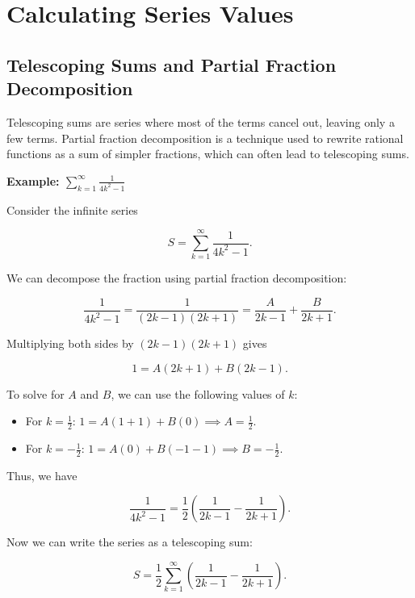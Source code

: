 \newpage
\section{Calculating Series Values}

\subsection{Telescoping Sums and Partial Fraction Decomposition}

Telescoping sums are series where most of the terms cancel out, leaving only a few terms. Partial fraction decomposition is a technique used to rewrite rational functions as a sum of simpler fractions, which can often lead to telescoping sums.
\vspace{\baselineskip}

\textbf{Example: \(\sum_{k=1}^{\infty} \frac{1}{4k^2 - 1}\)}
\vspace{\baselineskip}

Consider the infinite series

\[
    S = \sum_{k=1}^{\infty} \frac{1}{4k^2 - 1}.
\]

We can decompose the fraction using partial fraction decomposition:

\[
    \frac{1}{4k^2 - 1} = \frac{1}{(2k - 1)(2k + 1)} = \frac{A}{2k - 1} + \frac{B}{2k + 1}.
\]

Multiplying both sides by \((2k - 1)(2k + 1)\) gives

\[
    1 = A(2k + 1) + B(2k - 1).
\]

To solve for \(A\) and \(B\), we can use the following values of \(k\):

\begin{itemize}

    \item For \(k = \frac{1}{2}\): \(1 = A(1 + 1) + B(0) \implies A = \frac{1}{2}\).

    \item For \(k = -\frac{1}{2}\): \(1 = A(0) + B(-1 - 1) \implies B = -\frac{1}{2}\).

\end{itemize}

Thus, we have

\[
    \frac{1}{4k^2 - 1} = \frac{1}{2} \left( \frac{1}{2k - 1} - \frac{1}{2k + 1} \right).
\]

Now we can write the series as a telescoping sum:

\[
    S = \frac{1}{2} \sum_{k=1}^{\infty} \left( \frac{1}{2k - 1} - \frac{1}{2k + 1} \right).
\]

